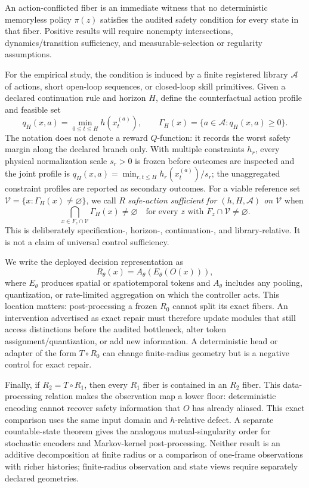 An action-conflicted fiber is an immediate witness that no deterministic memoryless policy
$\pi(z)$ satisfies the audited safety condition for every state in that fiber.  Positive results
will require nonempty intersections, dynamics/transition sufficiency, and measurable-selection or
regularity assumptions.

For the empirical study, the condition is induced by a finite registered library $\mathcal A$ of
actions, short open-loop sequences, or closed-loop skill primitives.  Given a declared continuation
rule and horizon $H$, define the counterfactual action profile and feasible set
\[
 q_H(x,a)=\min_{0\leq t\leq H} h(x_t^{(a)}),
 \qquad
 \Gamma_H(x)=\{a\in\mathcal A:q_H(x,a)\geq0\}.
\]
The notation does not denote a reward $Q$-function: it records the worst safety margin along the
declared branch only.  With multiple constraints $h_r$, every physical normalization scale
$s_r>0$ is frozen before outcomes are inspected and the joint profile is
$q_H(x,a)=\min_{r,t\leq H}h_r(x_t^{(a)})/s_r$; the unaggregated constraint profiles are reported as
secondary outcomes.  For a viable reference set
$\mathcal V=\{x:\Gamma_H(x)\neq\varnothing\}$, we call $R$ \emph{safe-action sufficient for
$(h,H,\mathcal A)$ on $\mathcal V$} when
\[
 \bigcap_{x\in F_z\cap\mathcal V}\Gamma_H(x)\neq\varnothing
 \quad\text{for every }z\text{ with }F_z\cap\mathcal V\neq\varnothing.
\]
This is deliberately specification-, horizon-, continuation-, and library-relative.  It is not a
claim of universal control sufficiency.

We write the deployed decision representation as
\[
 R_\theta(x)=A_\theta\!\left(E_\theta(O(x))\right),
\]
where $E_\theta$ produces spatial or spatiotemporal tokens and $A_\theta$ includes any pooling,
quantization, or rate-limited aggregation on which the controller acts.  This location matters:
post-processing a frozen $R_0$ cannot split its exact fibers.  An intervention advertised as exact
repair must therefore update modules that still access distinctions before the audited bottleneck,
alter token assignment/quantization, or add new information.  A deterministic head or adapter of
the form $T\circ R_0$ can change finite-radius geometry but is a negative control for exact repair.

Finally, if $R_2=T\circ R_1$, then every $R_1$ fiber is contained in an $R_2$ fiber.  This
data-processing relation makes the observation map a lower floor: deterministic encoding cannot
recover safety information that $O$ has already aliased.  This exact comparison uses the same input
domain and $h$-relative defect.  A separate countable-state theorem gives the analogous
mutual-singularity order for stochastic encoders and Markov-kernel post-processing.  Neither result
is an additive decomposition at finite radius or a comparison of one-frame observations with
richer histories; finite-radius observation and state views require separately declared geometries.
